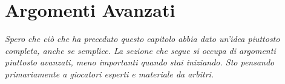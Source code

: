 \chapter{Argomenti Avanzati}

\textit{Spero che ciò che ha preceduto questo capitolo abbia dato un'idea piuttosto completa, anche se semplice. La sezione che segue si occupa di argomenti piuttosto avanzati, meno importanti quando stai iniziando. Sto pensando primariamente a giocatori esperti e materiale da arbitri.}

\clearpage

\clearpage





